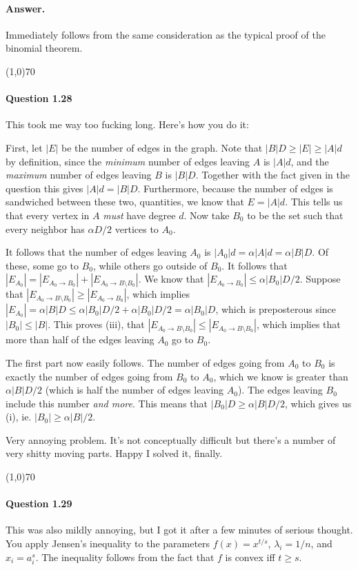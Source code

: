 \paragraph{Answer.} Immediately follows from the same consideration as the typical proof of the binomial theorem.

\begin{center}
	\line(1,0){70}
\end{center}

\paragraph{Question 1.28} This took me way too fucking long. Here's how you do it:

First, let $|E|$ be the number of edges in the graph. Note that $|B|D\geq|E|\geq|A|d$ by definition, since the \textit{minimum} number of edges leaving $A$ is $|A|d$, and the \textit{maximum} number of edges leaving $B$ is $|B|D$. Together with the fact given in the question this gives $|A|d=|B|D$. Furthermore, because the number of edges is sandwiched between these two, quantities, we know that $E=|A|d$. This tells us that every vertex in $A$ \textit{must} have degree $d$. Now take $B_0$ to be the set such that every neighbor has $\alpha D/2$ vertices to $A_0$.

It follows that the number of edges leaving $A_0$ is $|A_0|d = \alpha|A|d = \alpha|B|D$. Of these, some go to $B_0$, while others go outside of $B_0$. It follows that $|E_{A_0}|=|E_{A_0\rightarrow B_0}|+|E_{A_0\rightarrow B\setminus B_0}|$. We know that $|E_{A_0\rightarrow B_0}|\leq \alpha|B_0|D/2$. Suppose that $|E_{A_0\rightarrow B\setminus B_0}|\geq|E_{A_0\rightarrow B_0}|$, which implies $|E_{A_0}|=\alpha|B|D\leq \alpha|B_0|D/2+\alpha|B_0|D/2=\alpha|B_0|D$, which is preposterous since $|B_0|\leq |B|$. This proves (iii), that $|E_{A_0\rightarrow B\setminus B_0}|\leq |E_{A_0\rightarrow B\setminus B_0}|$, which implies that more than half of the edges leaving $A_0$ go to $B_0$.

The first part now easily follows. The number of edges going from $A_0$ to $B_0$ is exactly the number of edges going from $B_0$ to $A_0$, which we know is greater than $\alpha|B|D/2$ (which is half the number of edges leaving $A_0$). The edges leaving $B_0$ include this number \textit{and more}. This means that $|B_0|D\geq \alpha|B|D/2$, which gives us (i), ie. $|B_0|\geq\alpha|B|/2$.

Very annoying problem. It's not conceptually difficult but there's a number of very shitty moving parts. Happy I solved it, finally.

\begin{center}
	\line(1,0){70}
\end{center}

\paragraph{Question 1.29} This was also mildly annoying, but I got it after a few minutes of serious thought. You apply Jensen's inequality to the parameters $f(x)=x^{t/s}$, $\lambda_i = 1/n$, and $x_i = a_i^{s}$. The inequality follows from the fact that $f$ is convex iff $t\geq s$.